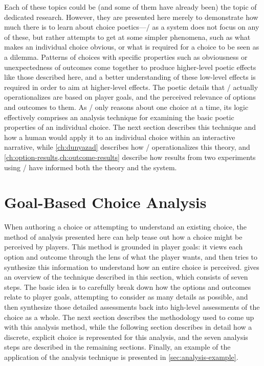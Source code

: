 Each of these topics could be (and some of them have already been) the topic of dedicated research.
%
However, they are presented here merely to demonstrate how much there is to learn about choice poetics---\dunyazad/ as a system does not focus on any of these, but rather attempts to get at some simpler phenomena, such as what makes an individual choice obvious, or what is required for a choice to be seen as a dilemma.
%
Patterns of choices with specific properties such as obviousness or unexpectedness of outcomes come together to produce higher-level poetic effects like those described here, and a better understanding of these low-level effects is required in order to aim at higher-level effects.
%
The poetic details that \dunyazad/ actually operationalizes are based on player goals, and the perceived relevance of options and outcomes to them.
%
As \dunyazad/ only reasons about one choice at a time, its logic effectively comprises an analysis technique for examining the basic poetic properties of an individual choice.
%
The next section describes this technique and how a human would apply it to an individual choice within an interactive narrative, while \cref{ch:dunyazad} describes how \dunyazad/ operationalizes this theory, and \cref{ch:option-results,ch:outcome-results} describe how results from two experiments using \dunyazad/ have informed both the theory and the system.

\section{Goal-Based Choice Analysis}

\label{sec:goal-based-choice-analysis}

When authoring a choice or attempting to understand an existing choice, the method of analysis presented here can help tease out how a choice might be perceived by players.
%
This method is grounded in player goals: it views each option and outcome through the lens of what the player wants, and then tries to synthesize this information to understand how an entire choice is perceived.
%
 gives an overview of the technique described in this section, which consists of seven steps.
%
The basic idea is to carefully break down how the options and outcomes relate to player goals, attempting to consider as many details as possible, and then synthesize those detailed assessments back into high-level assessments of the choice as a whole.
%
The next section describes the methodology used to come up with this analysis method, while the following section describes in detail how a discrete, explicit choice is represented for this analysis, and the seven analysis steps are described in the remaining sections.
%
Finally, an example of the application of the analysis technique is presented in \cref{sec:analysis-example}.


